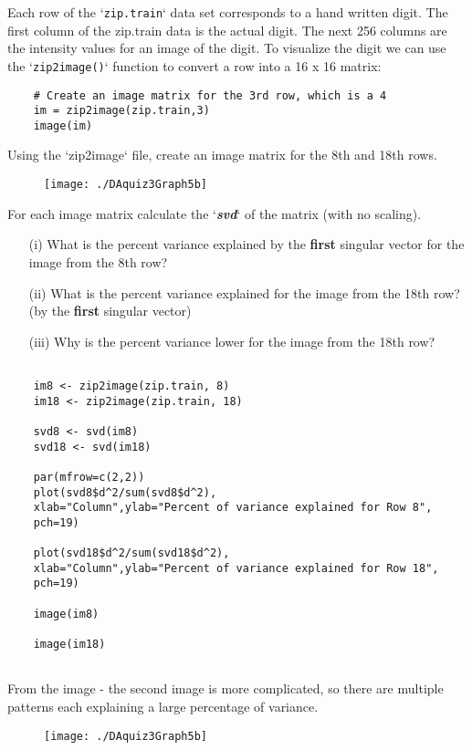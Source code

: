Each row of the `\texttt{zip.train}` data set corresponds to a hand written digit. The
first column of the zip.train data is the actual digit. The next 256 columns
are the intensity values for an image of the digit. To visualize the digit we
can use the `\texttt{zip2image()}` function to convert a row into a 16 x 16 matrix:

\begin{framed}
	\begin{verbatim}
	# Create an image matrix for the 3rd row, which is a 4
	im = zip2image(zip.train,3)
	image(im)
	\end{verbatim}
\end{framed}


Using the `zip2image` file, create an image matrix for the 8th and 18th rows.
\begin{figure}
	\centering
	\texttt{[image: ./DAquiz3Graph5b]}
	\caption{}
	\label{fig:DAquiz3Graph5}
\end{figure}
For each image matrix calculate the `\textit{\textbf{svd}}` of the matrix (with no scaling). 

\begin{itemize}
	\item[(i)] What is the percent variance explained by the \textbf{first} singular vector for the image
	from the 8th row? 
	\item[(ii)] What is the percent variance explained for the image from the
	18th row? (by the \textbf{first} singular vector)
	\item[(iii)] Why is the percent variance lower for the image from the 18th row?
\end{itemize}
\newpage
\begin{framed}
	\begin{verbatim}
	
	im8 <- zip2image(zip.train, 8)
	im18 <- zip2image(zip.train, 18)
	
	svd8 <- svd(im8)
	svd18 <- svd(im18)
	
	par(mfrow=c(2,2))
	plot(svd8$d^2/sum(svd8$d^2),
	xlab="Column",ylab="Percent of variance explained for Row 8",
	pch=19)
	
	plot(svd18$d^2/sum(svd18$d^2),
	xlab="Column",ylab="Percent of variance explained for Row 18",
	pch=19)
	
	image(im8)
	
	image(im18)
	
	\end{verbatim}
\end{framed}
\newpage
From the image - the second image is more complicated, so there are multiple patterns each explaining a large percentage of variance.
\begin{figure}[h!]
	\centering
	\texttt{[image: ./DAquiz3Graph5b]}
	\caption{}
	\label{fig:DAquiz3Graph5}
\end{figure}


